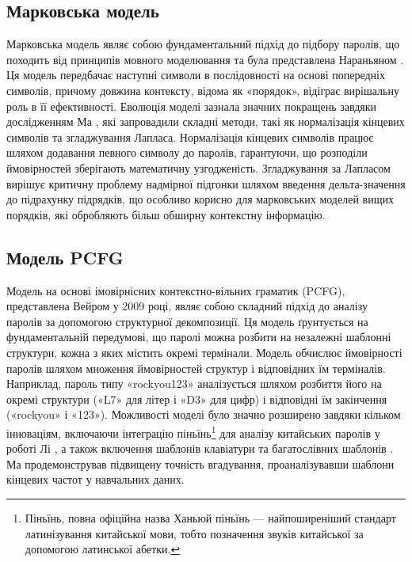 \subsection{Марковська модель}
Марковська модель являє собою фундаментальний підхід до підбору паролів, що походить від принципів мовного моделювання та була представлена Нараньяном \cite{Fast dictionary attacks on passwords using timespace tradeoﬀ}. Ця модель передбачає наступні символи в послідовності на основі попередніх символів, причому довжина контексту, відома як «порядок», відіграє вирішальну роль в її ефективності. Еволюція моделі зазнала значних покращень завдяки дослідженням Ма \cite{A study of probabilistic password models}, які запровадили складні методи, такі як нормалізація кінцевих символів та згладжування Лапласа. Нормалізація кінцевих символів працює шляхом додавання певного символу до паролів, гарантуючи, що розподіли ймовірностей зберігають математичну узгодженість. Згладжування за Лапласом вирішує критичну проблему надмірної підгонки шляхом введення дельта-значення до підрахунку підрядків, що особливо корисно для марковських моделей вищих порядків, які обробляють більш обширну контекстну інформацію.

\subsection{Модель PCFG}
Модель на основі імовірнісних контекстно-вільних граматик (PCFG), представлена Вейром \cite{Password cracking using probabilistic context-free grammars} у 2009 році, являє собою складний підхід до аналізу паролів за допомогою структурної декомпозиції. Ця модель ґрунтується на фундаментальній передумові, що паролі можна розбити на незалежні шаблонні структури, кожна з яких містить окремі термінали. Модель обчислює ймовірності паролів шляхом множення ймовірностей структур і відповідних їм терміналів. Наприклад, пароль типу «rockyou123» аналізується шляхом розбиття його на окремі структури («L7» для літер і «D3» для цифр) і відповідні їм закінчення («rockyou» і «123»). Можливості моделі було значно розширено завдяки кільком інноваціям, включаючи інтеграцію піньїнь\footnote{Піньїнь, повна офіційна назва Ханьюй піньїнь — найпоширеніший стандарт латинізування китайської мови, тобто позначення звуків китайської за допомогою латинської абетки.\cite{Pinyin wiki}} для аналізу китайських паролів у роботі Лі \cite{A large-scale empirical analysis of chinese web passwords}, а також включення шаблонів клавіатури та багатослівних шаблонів \cite{Next gen pcfg password crackingt}. Ма \cite{A study of probabilistic password models} продемонстрував підвищену точність вгадування, проаналізувавши шаблони кінцевих частот у навчальних даних.

